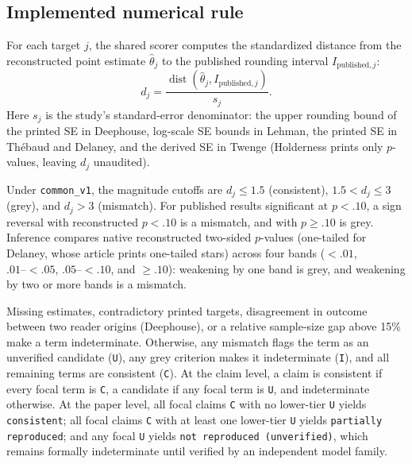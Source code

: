 \documentclass[11pt]{article}
\begin{document}
\subsection{Implemented numerical rule}
For each target $j$, the shared scorer computes the standardized distance from the reconstructed point estimate $\widehat\theta_j$ to the published rounding interval $I_{\mathrm{published},j}$:
\[
d_j=\frac{\operatorname{dist}(\widehat\theta_{j},I_{\mathrm{published},j})}{s_j}.
\]
Here $s_j$ is the study's standard-error denominator: the upper rounding bound of the printed SE in Deephouse, log-scale SE bounds in Lehman, the printed SE in Th\'ebaud and Delaney, and the derived SE in Twenge (Holderness prints only $p$-values, leaving $d_j$ unaudited).

Under \texttt{common\_v1}, the magnitude cutoffs are $d_j\leq1.5$ (consistent), $1.5<d_j\leq3$ (grey), and $d_j>3$ (mismatch). For published results significant at $p<.10$, a sign reversal with reconstructed $p<.10$ is a mismatch, and with $p\geq.10$ is grey. Inference compares native reconstructed two-sided $p$-values (one-tailed for Delaney, whose article prints one-tailed stars) across four bands ($<.01$, $.01\text{--}<.05$, $.05\text{--}<.10$, and $\geq.10$): weakening by one band is grey, and weakening by two or more bands is a mismatch.

Missing estimates, contradictory printed targets, disagreement in outcome between two reader origins (Deephouse), or a relative sample-size gap above 15\% make a term indeterminate. Otherwise, any mismatch flags the term as an unverified candidate (\texttt{U}), any grey criterion makes it indeterminate (\texttt{I}), and all remaining terms are consistent (\texttt{C}). At the claim level, a claim is consistent if every focal term is \texttt{C}, a candidate if any focal term is \texttt{U}, and indeterminate otherwise. At the paper level, all focal claims \texttt{C} with no lower-tier \texttt{U} yields \texttt{consistent}; all focal claims \texttt{C} with at least one lower-tier \texttt{U} yields \texttt{partially reproduced}; and any focal \texttt{U} yields \texttt{not reproduced (unverified)}, which remains formally indeterminate until verified by an independent model family.
\end{document}
